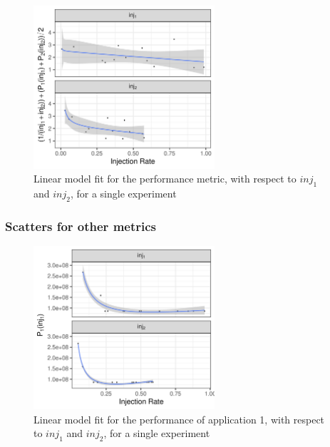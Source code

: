 \documentclass[a4paper]{article}
\begin{document}
\begin{figure}[h]
\centering
\includegraphics[width=0.6\textwidth]{./img/2_apps_min_mean_time/rs_20_samples_10_iterations_scatter_weighted_full_single.pdf}
\caption{Linear model fit for the performance metric, with respect to \(inj_1\) and \(inj_2\), for a single experiment}
\end{figure}

\subsubsection{Scatters for other metrics}
\label{sec:orgaff705a}
\begin{figure}[h]
\centering
\includegraphics[width=0.6\textwidth]{./img/2_apps_min_mean_time/rs_20_samples_10_iterations_scatter_app1_weighted_full.pdf}
\caption{Linear model fit for the performance of application 1, with respect to \(inj_1\) and \(inj_2\), for a single experiment}
\end{figure}
\end{document}
